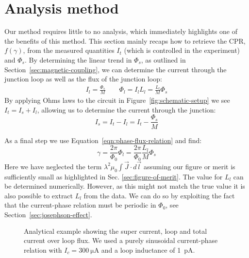 \section{Analysis method}
Our method requires little to no analysis, which immediately highlights one of the benefits of this method. This section mainly recaps how to retrieve the CPR, $f(\gamma)$, from the measured quantities $I_t$ (which is controlled in the experiment) and $\Phi_s$. By determining the linear trend in $\Phi_s$, as outlined in Section~\ref{sec:magnetic-coupling}, we can determine the current through the junction loop as well as the flux of the junction loop:
\begin{align}
	I_l = \frac{\Phi_s}{M} \qquad \Phi_l = I_lL_l = \frac{L_l}{M}\Phi_s
\end{align}
By applying Ohms laws to the circuit in Figure~\ref{fig:schematic-setup} we see $I_t = I_s + I_l$, allowing us to determine the current through the junction:
\begin{equation}
	I_s = I_t - I_l = I_t - \frac{\Phi_s}{M}
\end{equation}

As a final step we use Equation~\ref{eqn:phase-flux-relation} and find:
\begin{equation}
	\gamma = \frac{2\pi}{\Phi_0}\Phi_l = \frac{2\pi}{\Phi_0}\frac{L_l}{M}\Phi_s
\end{equation}
Here we have neglected the term $\lambda^2\mu_0 \int \vec{J}\cdot d \vec{l}$ assuming our figure or merit is sufficiently small as highlighted in Sec. \ref{sec:figure-of-merit}. The value for $L_l$ can be determined numerically. However, as this might not match the true value it is also possible to extract $L_l$ from the data. We can do so by exploiting the fact that the current-phase relation must be periodic in $\Phi_0$, see Section~\ref{sec:josephson-effect}. 

\begin{figure}[ht!]
	\centering
	
	\caption{Analytical example showing the super current, loop and total current over loop flux. We used a purely sinusoidal current-phase relation with $I_c=\qty{300}{\micro\ampere}$ and a loop inductance of \qty{1}{\pico\ampere}.}
\end{figure}